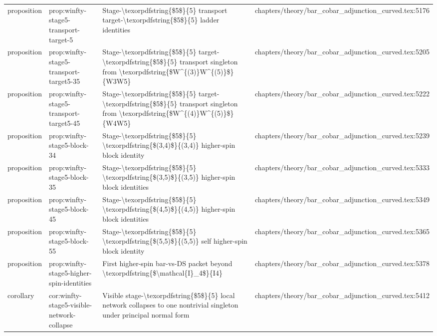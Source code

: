 \documentclass[11pt]{article}
\begin{document}
\begin{longtable}{L{0.10\textwidth}L{0.26\textwidth}L{0.42\textwidth}L{0.22\textwidth}}
proposition & prop:winfty-stage5-transport-target-5 & Stage-\textbackslash{}texorpdfstring\{\$5\$\}\{5\} transport target-\textbackslash{}texorpdfstring\{\$5\$\}\{5\} ladder identities & chapters/theory/bar\_cobar\_adjunction\_curved.tex:5176\\
proposition & prop:winfty-stage5-transport-target5-35 & Stage-\textbackslash{}texorpdfstring\{\$5\$\}\{5\} target-\textbackslash{}texorpdfstring\{\$5\$\}\{5\} transport singleton from \textbackslash{}texorpdfstring\{\$W\textasciicircum{}\{(3)\}W\textasciicircum{}\{(5)\}\$\}\{W3W5\} & chapters/theory/bar\_cobar\_adjunction\_curved.tex:5205\\
proposition & prop:winfty-stage5-transport-target5-45 & Stage-\textbackslash{}texorpdfstring\{\$5\$\}\{5\} target-\textbackslash{}texorpdfstring\{\$5\$\}\{5\} transport singleton from \textbackslash{}texorpdfstring\{\$W\textasciicircum{}\{(4)\}W\textasciicircum{}\{(5)\}\$\}\{W4W5\} & chapters/theory/bar\_cobar\_adjunction\_curved.tex:5222\\
proposition & prop:winfty-stage5-block-34 & Stage-\textbackslash{}texorpdfstring\{\$5\$\}\{5\} \textbackslash{}texorpdfstring\{\$(3,4)\$\}\{(3,4)\} higher-spin block identity & chapters/theory/bar\_cobar\_adjunction\_curved.tex:5239\\
proposition & prop:winfty-stage5-block-35 & Stage-\textbackslash{}texorpdfstring\{\$5\$\}\{5\} \textbackslash{}texorpdfstring\{\$(3,5)\$\}\{(3,5)\} higher-spin block identities & chapters/theory/bar\_cobar\_adjunction\_curved.tex:5333\\
proposition & prop:winfty-stage5-block-45 & Stage-\textbackslash{}texorpdfstring\{\$5\$\}\{5\} \textbackslash{}texorpdfstring\{\$(4,5)\$\}\{(4,5)\} higher-spin block identities & chapters/theory/bar\_cobar\_adjunction\_curved.tex:5349\\
proposition & prop:winfty-stage5-block-55 & Stage-\textbackslash{}texorpdfstring\{\$5\$\}\{5\} \textbackslash{}texorpdfstring\{\$(5,5)\$\}\{(5,5)\} self higher-spin block identity & chapters/theory/bar\_cobar\_adjunction\_curved.tex:5365\\
proposition & prop:winfty-stage5-higher-spin-identities & First higher-spin bar-vs-DS packet beyond \textbackslash{}texorpdfstring\{\$\textbackslash{}mathcal\{I\}\_4\$\}\{I4\} & chapters/theory/bar\_cobar\_adjunction\_curved.tex:5378\\
corollary & cor:winfty-stage5-visible-network-collapse & Visible stage-\textbackslash{}texorpdfstring\{\$5\$\}\{5\} local network collapses to one nontrivial singleton under principal normal form & chapters/theory/bar\_cobar\_adjunction\_curved.tex:5412\\

\end{longtable}
\end{document}

